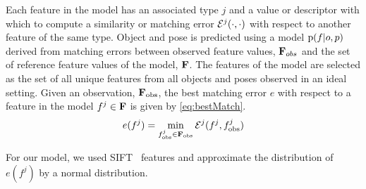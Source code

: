             Each feature in the model has an associated type $j$ and a value or descriptor with which to compute a similarity or matching error $\mathcal{E}^j(\cdot,\cdot)$ with respect to another feature of the same type. Object and pose is predicted using a model $\text{p}(f|o,p)$ derived from matching errors between observed feature values, $\mathbf{F}_{obs}$ and the set of reference feature values of the model, $\mathbf{F}$. The features of the model are selected as the set of all unique features from all objects and poses observed in an ideal setting. Given an observation, $\mathbf{F}_{\text{obs}}$, the best matching error $e$ with respect to a feature in the model $f^j \in \mathbf{F}$ is given by \eqref{eq:bestMatch}.
            \begin{equation}
                \label{eq:bestMatch}
                e(f^j) = \min_{f^j_{\text{obs}} \in \set{F}_{\text{obs}}}\cursive{E}^j(f^j,f^j_{\text{obs}})
            \end{equation}
            

            For our model, we used SIFT~\cite{lowe2004distinctive} features and approximate the distribution of $e(f^j)$ by a normal distribution.   

            

